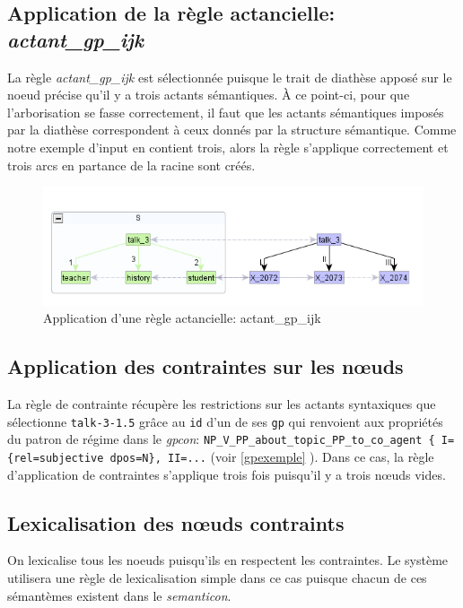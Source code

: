 \subsection{Application de la règle actancielle: \emph{actant\_gp\_ijk}}
La règle \emph{actant\_gp\_ijk} est sélectionnée puisque le trait de diathèse apposé sur le noeud précise qu'il y a trois actants sémantiques. À ce point-ci, pour que l'arborisation se fasse correctement, il faut que les actants sémantiques imposés par la diathèse correspondent à ceux donnés par la structure sémantique. Comme notre exemple d'input en contient trois, alors la règle s'applique correctement et trois arcs en partance de la racine sont créés.

\begin{figure}[htb]
	\centering
	\includegraphics[width=1\textwidth, trim = {0cm 0cm 0cm 0cm},clip]{ch6/figs/actant_gp_ijk.png}
	\caption{Application d'une règle actancielle: actant\_gp\_ijk}
	\label{deroulement2}
\end{figure}

\subsection{Application des contraintes sur les n\oe{}uds}
La règle de contrainte récupère les restrictions sur les actants syntaxiques que sélectionne \texttt{talk-3-1.5} grâce au \texttt{id} d'un de ses \texttt{gp} qui renvoient aux propriétés du patron de régime dans le \emph{gpcon}: \lstinline|NP_V_PP_about_topic_PP_to_co_agent { I={rel=subjective dpos=N}, II=...| (voir \ref{gpexemple} ). Dans ce cas, la règle d'application de contraintes s'applique trois fois puisqu'il y a trois n\oe{}uds vides.

\subsection{Lexicalisation des n\oe{}uds contraints}
On lexicalise tous les noeuds puisqu'ils en respectent les contraintes. Le système utilisera une règle de lexicalisation simple dans ce cas puisque chacun de ces sémantèmes existent dans le \emph{semanticon}.

